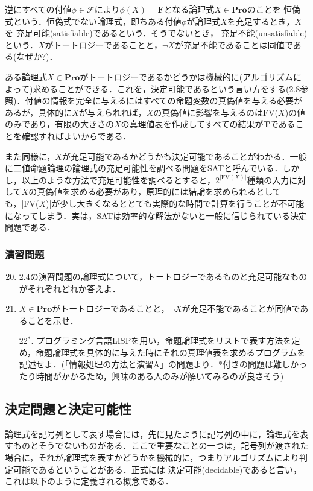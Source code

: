 \documentclass{ltjsarticle}
\theoremstyle{mystyle1}
\theoremstyle{mystyle3}
\theoremstyle{mystyle2}
\newcommand{\bT}{\ensuremath{\mathbf{T}}}
\newcommand{\bF}{\ensuremath{\mathbf{F}}}
\newcommand{\bPro}{\ensuremath{\mathbf{Pro}}}
\newcommand{\cF}{\ensuremath{\mathcal{F}}}
\newcommand{\red}[1]{{\color{red} #1}}
\begin{document}
逆にすべての付値$\phi\in\cF$により$\phi(X) = \bF$となる論理式$X\in\bPro$のことを\red{恒偽}式という．恒偽式でない論理式，即ちある付値$\phi$が論理式$X$を充足するとき，$X$を\red{充足可能}(satisfiable)であるという．そうでないとき，\red{充足不能}(unsatisfiable)という．$X$がトートロジーであることと，$\neg X$が充足不能であることは同値である(なぜか?)．

ある論理式$X\in\bPro$がトートロジーであるかどうかは機械的に(アルゴリズムによって)求めることができる．これを，決定可能であるという言い方をする(2.8参照)．付値の情報を完全に与えるにはすべての命題変数の真偽値を与える必要があるが，具体的に$X$が与えられれば，$X$の真偽値に影響を与えるのはFV($X$)の値のみであり，有限の大きさの$X$の真理値表を作成してすべての結果が$\bT$であることを確認すればよいからである．

また同様に，$X$が充足可能であるかどうかも決定可能であることがわかる．一般に二値命題論理の論理式の充足可能性を調べる問題をSATと呼んでいる．しかし，以上のような方法で充足可能性を調べるとすると，$2^{|\textrm{FV}(X)|}$種類の入力に対して$X$の真偽値を求める必要があり，原理的には結論を求められるとしても，|FV($X$)|が少し大きくなるととても実際的な時間で計算を行うことが不可能になってしまう．実は，SATは効率的な解法がないと一般に信じられている決定問題である．
\subsubsection*{演習問題}
\begin{enumerate}
  \setcounter{enumi}{19}
  \item 2.4の演習問題の論理式について，トートロジーであるものと充足可能なものがそれぞれどれか答えよ．
  \item $X\in\bPro$がトートロジーであることと，$\neg X$が充足不能であることが同値であることを示せ．
  \item[22$^\ast$.] プログラミング言語LISPを用い，命題論理式をリストで表す方法を定め，命題論理式を具体的に与えた時にそれの真理値表を求めるプログラムを記述せよ．(「情報処理の方法と演習A」の問題より．*付きの問題は難しかったり時間がかかるため，興味のある人のみが解いてみるのが良さそう)
\end{enumerate}
\subsection{決定問題と決定可能性}
論理式を記号列として表す場合には，先に見たように記号列の中に，論理式を表すものとそうでないものがある．ここで重要なことの一つは，記号列が渡された場合に，それが論理式を表すかどうかを機械的に，つまりアルゴリズムにより判定可能であるということがある．正式には\red{決定可能}(decidable)であると言い，これは以下のように定義される概念である．
\end{document}
